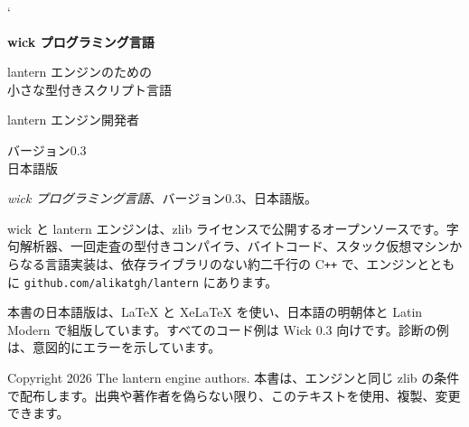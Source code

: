 \documentclass[10pt]{book}
\newif\ifwickappendix
\begin{document}
\lstMakeShortInline[basicstyle=\ttfamily,keywordstyle=\color{wkKeyword}]`

\begin{titlepage}
\centering
\vspace*{1.4in}
{\Huge\bfseries wick プログラミング言語\par}
\vspace{1.2em}
{\large lantern エンジンのための\\小さな型付きスクリプト言語\par}
\vfill
{\large lantern エンジン開発者\par}
\vspace{0.8em}
{\normalsize バージョン0.3 \quad\textbullet{}\\日本語版\par}
\vspace{1.2in}
\end{titlepage}

\thispagestyle{empty}
\null\vfill
\noindent
\textit{wick プログラミング言語}、バージョン0.3、日本語版。\par
\vspace{0.6em}
\noindent
wick と lantern エンジンは、zlib ライセンスで公開するオープンソースです。字句解析器、一回走査の型付きコンパイラ、バイトコード、スタック仮想マシンからなる言語実装は、依存ライブラリのない約二千行の \mbox{C\texttt{++}} で、エンジンとともに
\texttt{github.com/alikatgh/lantern} にあります。\par
\vspace{0.6em}
\noindent
本書の日本語版は、\LaTeX{} と XeLaTeX を使い、日本語の明朝体と Latin Modern で組版しています。すべてのコード例は Wick 0.3 向けです。診断の例は、意図的にエラーを示しています。\par
\vspace{0.6em}
\noindent
Copyright \textcopyright{} 2026 The lantern engine authors.
本書は、エンジンと同じ zlib の条件で配布します。出典や著作者を偽らない限り、このテキストを使用、複製、変更できます。\par
\vfill

\frontmatter
\tableofcontents

\mainmatter










\wickappendixtrue
\appendix

\end{document}
